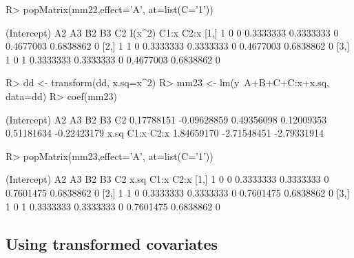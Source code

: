 \documentclass[11pt]{article}
\begin{document}
\begin{Schunk}
\begin{Sinput}
R> popMatrix(mm22,effect='A', at=list(C='1'))
\end{Sinput}
\begin{Soutput}
     (Intercept) A2 A3        B2        B3 C2    I(x^2)      C1:x C2:x
[1,]           1  0  0 0.3333333 0.3333333  0 0.4677003 0.6838862    0
[2,]           1  1  0 0.3333333 0.3333333  0 0.4677003 0.6838862    0
[3,]           1  0  1 0.3333333 0.3333333  0 0.4677003 0.6838862    0
\end{Soutput}
\end{Schunk}


\begin{Schunk}
\begin{Sinput}
R> dd <- transform(dd, x.sq=x^2)
R> mm23 <- lm(y~A+B+C+C:x+x.sq, data=dd)
R> coef(mm23)
\end{Sinput}
\begin{Soutput}
(Intercept)          A2          A3          B2          B3          C2 
 0.17788151 -0.09628859  0.49356098  0.12009353  0.51181634 -0.22423179 
       x.sq        C1:x        C2:x 
 1.84659170 -2.71548451 -2.79331914 
\end{Soutput}
\begin{Sinput}
R> popMatrix(mm23,effect='A', at=list(C='1'))
\end{Sinput}
\begin{Soutput}
     (Intercept) A2 A3        B2        B3 C2      x.sq      C1:x C2:x
[1,]           1  0  0 0.3333333 0.3333333  0 0.7601475 0.6838862    0
[2,]           1  1  0 0.3333333 0.3333333  0 0.7601475 0.6838862    0
[3,]           1  0  1 0.3333333 0.3333333  0 0.7601475 0.6838862    0
\end{Soutput}
\end{Schunk}


\subsection{Using transformed covariates}
\end{document}
